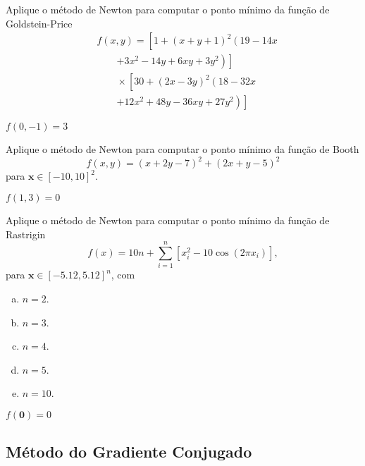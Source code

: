 \begin{exer}
  Aplique o método de Newton para computar o ponto mínimo da função de Goldstein-Price \cite{Goldstein1971a}
  \begin{equation}
    \begin{aligned}
      & f(x,y) = \left[1+\left(x+y+1\right)^{2}\left(19-14x \right.\right.\\
      &\qquad \left.\left.+ 3x^{2}-14y+6xy+3y^{2}\right)\right] \\
      &\qquad \times \left[30+\left(2x-3y\right)^{2}\left(18-32x\right.\right.\\
      &\qquad \left.\left.+12x^{2}+48y-36xy+27y^{2}\right)\right]
    \end{aligned}  
  \end{equation}
\end{exer}
\begin{resp}
  $f(0,-1) = 3$
\end{resp}

\begin{exer}
  Aplique o método de Newton para computar o ponto mínimo da função de Booth
  \begin{equation}
    f(x,y) = \left( x + 2y -7\right)^{2} + \left(2x +y - 5\right)^{2}
  \end{equation}
  para $\pmb{x}\in [-10, 10]^2$.
\end{exer}
\begin{resp}
  $f(1,3)=0$
\end{resp}

\begin{exer}
  Aplique o método de Newton para computar o ponto mínimo da função de Rastrigin
  \begin{equation}
    f(x) = 10 n + \sum_{i=1}^n \left[x_i^2 - 10\cos(2 \pi x_i)\right],
  \end{equation}
  para $\pmb{x}\in[-5.12, 5.12]^n$, com
  \begin{enumerate}[a)]
    \item $n = 2$.
    \item $n = 3$.
    \item $n = 4$.
    \item $n = 5$.
    \item $n = 10$.
  \end{enumerate}
\end{exer}
\begin{resp}
$f(\pmb{0}) = 0$
\end{resp}

\subsection{Método do Gradiente Conjugado}
\badgeRevisar

